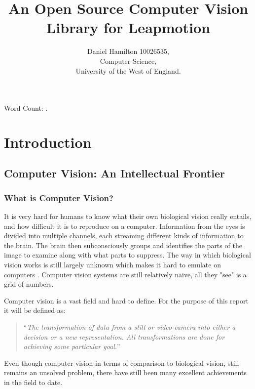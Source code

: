 \documentclass[11pt,oneside]{report}
\title{An Open Source Computer Vision Library for Leapmotion}
\author{Daniel Hamilton 10026535,\\Computer Science,\\University of the West of England.}
\begin{document}
	\maketitle
	\tableofcontents

	
	Word Count: \bashStdout.
	\begin{abstract}
	
	\end{abstract}	
	\chapter{Introduction}\label{chap:introduction}
		\section{Computer Vision: An Intellectual Frontier}
			\subsection{What is Computer Vision?}		
				
				It is very hard for humans to know what their own biological vision really entails, and how difficult it is to reproduce on a computer.
				Information from the eyes is divided into multiple channels, each streaming different kinds of information to the brain.
				The brain then subconsciously groups and identifies the parts of the image to examine along with what parts to suppress.
				The way in which biological vision works is still largely unknown which makes it hard to emulate on computers \cite[p. xi]{book:multiViewGeo}.				
				Computer vision systems are still relatively naive, all they "see" is a grid of numbers.%
				
				
				Computer vision is a vast field and hard to define.
				For the purpose of this report it will be defined as:
	
				\begin{quote}
					``\textit{The transformation of data from a still or video camera into either a decision or a new representation.
						All transformations are done for achieving some particular goal.}'' \cite[p. 2]{definition:cv}
				\end{quote}
				
				Even though computer vision in terms of comparison to biological vision, still remains an unsolved problem, there have still been many excellent achievements in the field to date.
\end{document}
